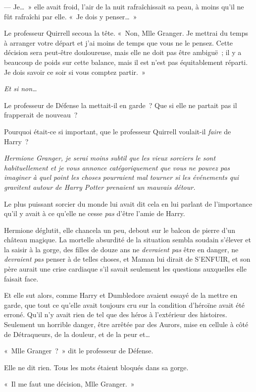 --- Je…~» elle avait froid, l'air de la nuit rafraîchissait sa peau, à moins qu'il ne fût rafraîchi par elle. «~Je dois y penser…~»

Le professeur Quirrell secoua la tête. «~Non, Mlle Granger. Je mettrai du temps à arranger votre départ et j'ai moins de temps que vous ne le pensez. Cette décision sera peut-être douloureuse, mais elle ne doit pas être ambiguë~; il y a beaucoup de poids sur cette balance, mais il est n'est pas équitablement réparti. Je dois savoir ce soir si vous comptez partir.~»

\emph{Et si non…}

Le professeur de Défense la mettait-il en garde~? Que si elle ne partait pas il frapperait de nouveau~?

Pourquoi était-ce si important, que le professeur Quirrell voulait-il \emph{faire} de Harry~?

\emph{Hermione Granger, je serai moins subtil que les vieux sorciers le sont habituellement et je vous annonce catégoriquement que vous ne pouvez pas imaginer à quel point les choses pourraient mal tourner si les événements qui gravitent autour de Harry Potter prenaient un mauvais détour.}

Le plus puissant sorcier du monde lui avait dit cela en lui parlant de l'importance qu'il y avait à ce qu'elle ne cesse \emph{pas} d'être l'amie de Harry.

Hermione déglutit, elle chancela un peu, debout sur le balcon de pierre d'un château magique. La mortelle absurdité de la situation sembla soudain s'élever et la saisir à la gorge, des filles de douze ans ne \emph{devraient pas} être en danger, ne \emph{devraient pas} penser à de telles choses, et Maman lui dirait de S'ENFUIR, et son père aurait une crise cardiaque s'il savait seulement les questions auxquelles elle faisait face.

Et elle sut alors, comme Harry et Dumbledore avaient essayé de la mettre en garde, que tout ce qu'elle avait toujours cru sur la condition d'héroïne avait été erroné. Qu'il n'y avait rien de tel que des héros à l'extérieur des histoires. Seulement un horrible danger, être arrêtée par des Aurors, mise en cellule à côté de Détraqueurs, de la douleur, et de la peur et…

«~Mlle Granger~?~» dit le professeur de Défense.

Elle ne dit rien. Tous les mots étaient bloqués dans sa gorge.

«~Il me faut une décision, Mlle Granger.~»


